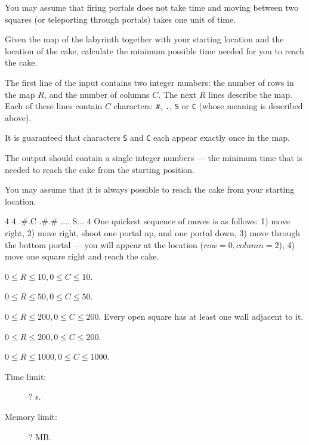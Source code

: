\documentclass{boi2014}
\newcommand{\constant}[1]{{\tt #1}}
\begin{document}
    You may assume that firing portals does not take time and moving
    between two squares (or teleporting through portals) takes one unit
    of time.

    \Task
    Given the map of the labyrinth together with your starting location
    and the location of the cake, calculate the minimum possible time needed
    for you to reach the cake.

    \Input
    The first line of the input contains two integer numbers: the number of rows
    in the map $R$, and the number of columns $C$. The next $R$ lines describe
    the map. Each of these lines contain $C$ characters: \constant{\#},
    \constant{.}, \constant{S} or \constant{C} (whose meaning is described
    above).

    It is guaranteed that characters \constant{S} and \constant{C} each appear
    exactly once in the map.

    \Output
    The output should contain a single integer numbers --- the minimum time that
    is needed to reach the cake from the starting position.

    You may assume that it is always possible to reach the cake from your
    starting location.

    \Example
    \example
    {
        4 4\newline
        .\#.C\newline
        .\#.\#\newline
        ....\newline
        S...
    }
    {
        4
    }
    {
        One quickest sequence of moves is as follows: 1) move right, 2) move
        right, shoot one portal up, and one portal down, 3) move through the
        bottom portal --- you will appear at the location ($row = 0,
        column = 2$), 4) move one square right and reach the cake.
    }

    \Scoring

    \begin{description}[leftmargin=0pt]
        \item[Subtask 1 (? points):] $0 \le R \le 10, 0 \le C \le 10$.
        \item[Subtask 2 (? points):] $0 \le R \le 50, 0 \le C \le 50$.
        \item[Subtask 3 (? points):] $0 \le R \le 200, 0 \le C \le 200$.
        Every open square has at least one wall adjacent to it.
        \item[Subtask 4 (? points):] $0 \le R \le 200, 0 \le C \le 200$.
        \item[Subtask 5 (? points):] $0 \le R \le 1000, 0 \le C \le 1000$.
    \end{description}

    \Constraints

    \begin{description}
        \item[Time limit:] ? s.
        \item[Memory limit:] ? MB.
    \end{description}
\end{document}
